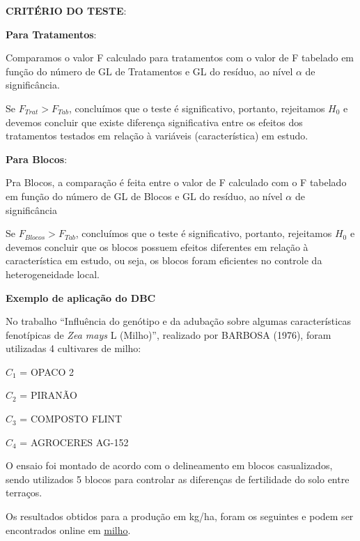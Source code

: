 \documentclass[
]{book}
\begin{document}
\textbf{CRITÉRIO DO TESTE}:

\textbf{Para Tratamentos}:

Comparamos o valor F calculado para tratamentos com o valor de F tabelado em função do número de GL de Tratamentos e GL do resíduo, ao nível \(\alpha\) de significância.

Se \(F_{Trat} > F_{Tab}\), concluímos que o teste é significativo, portanto, rejeitamos \(H_0\) e devemos concluir que existe diferença significativa entre os efeitos dos tratamentos testados em relação à variáveis (característica) em estudo.

\textbf{Para Blocos}:

Pra Blocos, a comparação é feita entre o valor de F calculado com o F tabelado em função do número de GL de Blocos e GL do resíduo, ao nível \(\alpha\) de significância

Se \(F_{Blocos} > F_{Tab}\), concluímos que o teste é significativo, portanto, rejeitamos \(H_0\) e devemos concluir que os blocos possuem efeitos diferentes em relação à característica em estudo, ou seja, os blocos foram eficientes no controle da heterogeneidade local.

\textbf{Exemplo de aplicação do DBC}

No trabalho ``Influência do genótipo e da adubação sobre algumas características fenotípicas de \emph{Zea mays} L (Milho)'', realizado por BARBOSA (1976), foram utilizadas 4 cultivares de milho:

\(C_1\) = OPACO 2

\(C_2\) = PIRANÃO

\(C_3\) = COMPOSTO FLINT

\(C_4\) = AGROCERES AG-152

O ensaio foi montado de acordo com o delineamento em blocos casualizados, sendo utilizados 5 blocos para controlar as diferenças de fertilidade do solo entre terraços.

Os resultados obtidos para a produção em kg/ha, foram os seguintes e podem ser encontrados online em \href{https://raw.githubusercontent.com/arpanosso/curso_GIEU/master/dados/milho.txt}{milho}.
\end{document}
